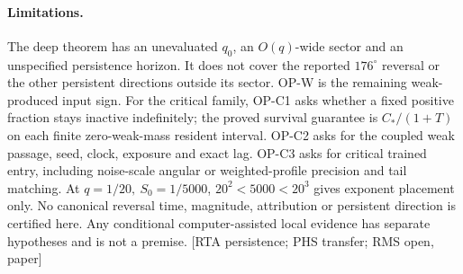 \documentclass[10pt,twocolumn]{article}
\newcommand{\src}[1]{\textnormal{\small [#1]}}
\begin{document}
\paragraph{Limitations.}
The deep theorem has an unevaluated \(q_0\), an \(O(q)\)-wide sector
and an unspecified persistence horizon. It does not cover the reported
\(176^\circ\) reversal or the other persistent directions outside its
sector. OP-W is the remaining weak-produced input sign. For the
critical family, OP-C1 asks whether a fixed positive fraction stays
inactive indefinitely; the proved survival guarantee is
\(C_*/(1+T)\) on each finite zero-weak-mass resident interval.
OP-C2 asks for the coupled weak passage, seed, clock, exposure and
exact lag. OP-C3 asks for critical trained entry, including
noise-scale angular or weighted-profile precision and tail matching.
At \(q=1/20,\ S_0=1/5000\), \(20^2<5000<20^3\) gives exponent
placement only. No canonical reversal time, magnitude, attribution
or persistent direction is certified here. Any conditional
computer-assisted local evidence has separate hypotheses and is
not a premise. \src{RTA persistence; PHS transfer; RMS open, paper}

\clearpage\onecolumn\appendix
\end{document}
